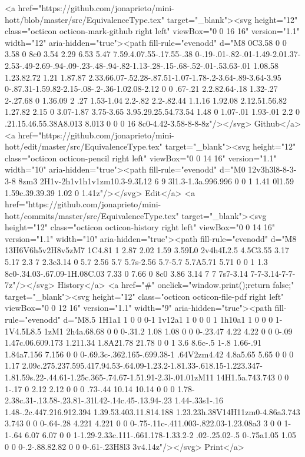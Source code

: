       <a href="https://github.com/jonaprieto/mini-hott/blob/master/src/EquivalenceType.tex" target="_blank"><svg height="12" class="octicon octicon-mark-github right left" viewBox="0 0 16 16" version="1.1" width="12" aria-hidden="true"><path fill-rule="evenodd" d="M8 0C3.58 0 0 3.58 0 8c0 3.54 2.29 6.53 5.47 7.59.4.07.55-.17.55-.38 0-.19-.01-.82-.01-1.49-2.01.37-2.53-.49-2.69-.94-.09-.23-.48-.94-.82-1.13-.28-.15-.68-.52-.01-.53.63-.01 1.08.58 1.23.82.72 1.21 1.87.87 2.33.66.07-.52.28-.87.51-1.07-1.78-.2-3.64-.89-3.64-3.95 0-.87.31-1.59.82-2.15-.08-.2-.36-1.02.08-2.12 0 0 .67-.21 2.2.82.64-.18 1.32-.27 2-.27.68 0 1.36.09 2 .27 1.53-1.04 2.2-.82 2.2-.82.44 1.1.16 1.92.08 2.12.51.56.82 1.27.82 2.15 0 3.07-1.87 3.75-3.65 3.95.29.25.54.73.54 1.48 0 1.07-.01 1.93-.01 2.2 0 .21.15.46.55.38A8.013 8.013 0 0 0 16 8c0-4.42-3.58-8-8-8z"/></svg> Github</a>
      <a href="https://github.com/jonaprieto/mini-hott/edit/master/src/EquivalenceType.tex" target="_blank"><svg height="12" class="octicon octicon-pencil right left" viewBox="0 0 14 16" version="1.1" width="10" aria-hidden="true"><path fill-rule="evenodd" d="M0 12v3h3l8-8-3-3-8 8zm3 2H1v-2h1v1h1v1zm10.3-9.3L12 6 9 3l1.3-1.3a.996.996 0 0 1 1.41 0l1.59 1.59c.39.39.39 1.02 0 1.41z"/></svg> Edit</a>
      <a href="https://github.com/jonaprieto/mini-hott/commits/master/src/EquivalenceType.tex" target="_blank"><svg height="12" class="octicon octicon-history right left" viewBox="0 0 14 16" version="1.1" width="10" aria-hidden="true"><path fill-rule="evenodd" d="M8 13H6V6h5v2H8v5zM7 1C4.81 1 2.87 2.02 1.59 3.59L0 2v4h4L2.5 4.5C3.55 3.17 5.17 2.3 7 2.3c3.14 0 5.7 2.56 5.7 5.7s-2.56 5.7-5.7 5.7A5.71 5.71 0 0 1 1.3 8c0-.34.03-.67.09-1H.08C.03 7.33 0 7.66 0 8c0 3.86 3.14 7 7 7s7-3.14 7-7-3.14-7-7-7z"/></svg> History</a>
      <a  href="#" onclick="window.print();return false;" target="_blank"><svg height="12" class="octicon octicon-file-pdf right left" viewBox="0 0 12 16" version="1.1" width="9" aria-hidden="true"><path fill-rule="evenodd" d="M8.5 1H1a1 1 0 0 0-1 1v12a1 1 0 0 0 1 1h10a1 1 0 0 0 1-1V4.5L8.5 1zM1 2h4a.68.68 0 0 0-.31.2 1.08 1.08 0 0 0-.23.47 4.22 4.22 0 0 0-.09 1.47c.06.609.173 1.211.34 1.8A21.78 21.78 0 0 1 3.6 8.6c-.5 1-.8 1.66-.91 1.84a7.156 7.156 0 0 0-.69.3c-.362.165-.699.38-1 .64V2zm4.42 4.8a5.65 5.65 0 0 0 1.17 2.09c.275.237.595.417.94.53-.64.09-1.23.2-1.81.33-.618.15-1.223.347-1.81.59s.22-.44.61-1.25c.365-.74.67-1.51.91-2.3l-.01.01zM11 14H1.5a.743.743 0 0 1-.17 0 2.12 2.12 0 0 0 .73-.44 10.14 10.14 0 0 0 1.78-2.38c.31-.13.58-.23.81-.31l.42-.14c.45-.13.94-.23 1.44-.33s1-.16 1.48-.2c.447.216.912.394 1.39.53.403.11.814.188 1.23.23h.38V14H11zm0-4.86a3.743 3.743 0 0 0-.64-.28 4.221 4.221 0 0 0-.75-.11c-.411.003-.822.03-1.23.08a3 3 0 0 1-1-.64 6.07 6.07 0 0 1-1.29-2.33c.111-.661.178-1.33.2-2 .02-.25.02-.5 0-.75a1.05 1.05 0 0 0-.2-.88.82.82 0 0 0-.61-.23H8l3 3v4.14z"/></svg> Print</a>
